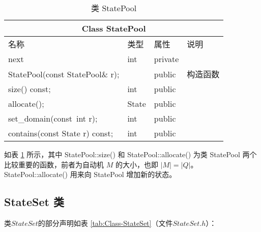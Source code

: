 \begin{table}[!htbp]
    \caption{类 StatePool}
    \label{tab:Class-StatePool}
    \centering
    \small%
    \setlength{\tabcolsep}{4pt}%
    \renewcommand{\arraystretch}{1.2}%
        \begin{tabular}{llll} %
        \toprule 
         \multicolumn{4}{c}{Class StatePool} \\
        \midrule
        名称& 类型 & 属性  &\mbox{说明} \\
        \midrule
        next & int & private &          \\
        \midrule 
        StatePool(const StatePool\& r);& & public &构造函数 \\
        size() const; & int & public & \\
        allocate();  &   State &  public & \\
        set\_domain(const\ int r); & int & public & \\
        contains(const State r) const; & int & public & \\
        \bottomrule 
    \end{tabular}
\end{table}
如表 \ref{tab:Class-StatePool} 所示，其中 StatePool::size() 和 StatePool::allocate() 为类 StatePool 两个比较重要的函数，前者为自动机 $M$ 的大小，也即 $|M|=|Q|$。 StatePool::allocate() 用来向 StatePool 增加新的状态。
\subsection{StateSet 类}
类$StateSet$的部分声明如表 \ref{tab:Class-StateSet}（文件$StateSet.h$）：
    

